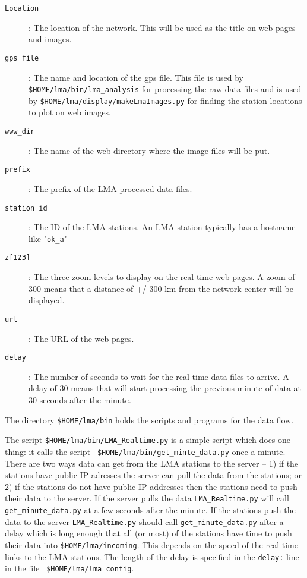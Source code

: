 \documentclass[12pt]{article}
\begin{document}
\begin{description}
\item [{\tt Location}]: The location of the network.  This will be used as the title on web
pages and images.
\item [{\tt gps\_file}]: The name and location of the gps file. This file is used by 
{\tt \$HOME/lma/bin/lma\_analysis} for processing the raw data files and is used by 
{\tt \$HOME/lma/display/makeLmaImages.py} for finding the station locations to plot on web
images.
\item [{\tt www\_dir}]: The name of the web directory where the image files will be put.
\item [{\tt prefix}]: The prefix of the LMA processed data files.  
\item [{\tt station\_id}]: The ID of the LMA stations.  An LMA station typically has a hostname like "\verb+ok_a+"
\item [{\tt z[123]}]: The three zoom levels to display on the real-time web pages.  A zoom of 300 means that a distance of +/-300 km from the
network center will be displayed.
\item [{\tt url}]: The URL of the web pages.
\item[{\tt delay}]:  The number of seconds to wait for the real-time data files to arrive.  A delay of 30 means that will start processing the
previous minute of data at 30 seconds after the minute.
\end{description}

The directory {\tt \$HOME/lma/bin} holds the scripts and programs for the data flow.  

The script {\tt \$HOME/lma/bin/LMA\_Realtime.py} is a simple script which does one thing:  it calls the script {\tt
\$HOME/lma/bin/get\_minte\_data.py} once a minute.  There are two ways data can get from the LMA stations to the server -- 1) if the stations
have public IP adresses the server can pull the data from the stations; or 2) if the stations do not have public IP addresses then the
stations need to push their data to the server.  If the server pulls the data {\tt LMA\_Realtime.py} will call {\tt get\_minute\_data.py} at a
few seconds after the minute.  If the stations push the data to the server {\tt LMA\_Realtime.py} should call {\tt get\_minute\_data.py} after
a delay which is long enough that all (or most) of the stations have time to push their data into {\tt \$HOME/lma/incoming}.   This depends on
the speed of the real-time links to the LMA stations.  The length of the delay is specified in the {\tt delay:} line in the file {\tt
\$HOME/lma/lma\_config}.
\end{document}
